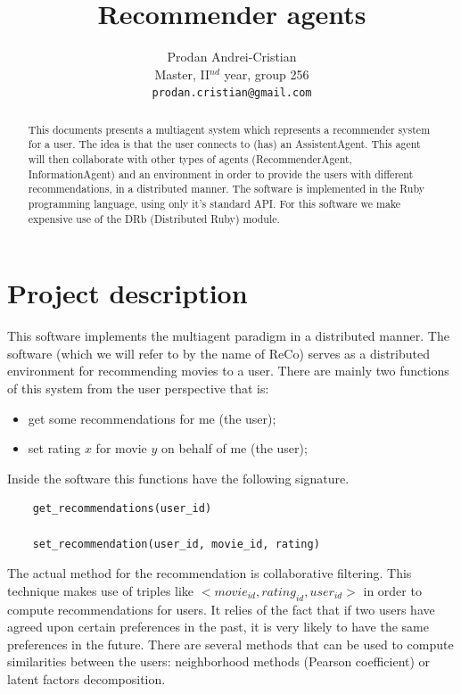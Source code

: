 \documentclass[11pt,a4paper]{article} %
\title{Recommender agents}
\author{Prodan Andrei-Cristian \\ 
		Master, II$^{nd}$ year, group 256 \\
		\texttt{prodan.cristian@gmail.com}}
\begin{document}
\maketitle


\begin{abstract}
This documents presents a multiagent system which represents a recommender system for a user. The idea is that the user connects to (has) an AssistentAgent. This agent will then collaborate with other types of agents (RecommenderAgent, InformationAgent) and an environment in order to provide the users with different recommendations, in a distributed manner. The software is implemented in the Ruby programming language, using only it's standard API. For this software we make expensive use of the DRb (Distributed Ruby) module.
\end{abstract}


\section{Project description}
This software implements the multiagent paradigm in a distributed manner. The software (which we will refer to by the name of ReCo) serves as a distributed environment for recommending movies to a user. There are mainly two functions of this system from the user perspective that is:
\begin{itemize}
    \item get some recommendations for me (the user);
    \item set rating $x$ for movie $y$ on behalf of me (the user);
\end{itemize}

Inside the software this functions have the following signature. 
\begin{verbatim}
    get_recommendations(user_id)
    
    set_recommendation(user_id, movie_id, rating)
\end{verbatim}

The actual method for the recommendation is collaborative filtering. This technique makes use of triples like $<movie_{id}, rating_{id}, user_{id}>$ in order to compute recommendations for users. It relies of the fact that if two users have agreed upon certain preferences in the past, it is very likely to have the same preferences in the future. There are several methods that can be used to compute similarities between the users: neighborhood methods (Pearson coefficient) or latent factors decomposition. 
\end{document}

